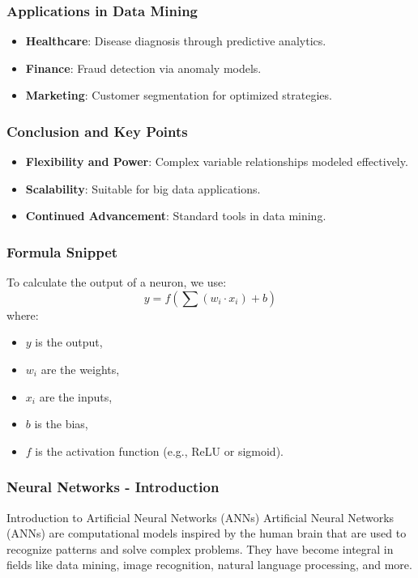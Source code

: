 \documentclass[aspectratio=169]{beamer}
\begin{document}
\begin{frame}[fragile]
    \frametitle{Applications in Data Mining}
    \begin{itemize}
        \item \textbf{Healthcare}: Disease diagnosis through predictive analytics.
        \item \textbf{Finance}: Fraud detection via anomaly models.
        \item \textbf{Marketing}: Customer segmentation for optimized strategies.
    \end{itemize}
\end{frame}

\begin{frame}[fragile]
    \frametitle{Conclusion and Key Points}
    \begin{itemize}
        \item \textbf{Flexibility and Power}: Complex variable relationships modeled effectively.
        \item \textbf{Scalability}: Suitable for big data applications.
        \item \textbf{Continued Advancement}: Standard tools in data mining.
    \end{itemize}
\end{frame}

\begin{frame}[fragile]
    \frametitle{Formula Snippet}
    To calculate the output of a neuron, we use:
    \begin{equation}
        y = f\left(\sum (w_i \cdot x_i) + b\right)
    \end{equation}
    where:
    \begin{itemize}
        \item \(y\) is the output,
        \item \(w_i\) are the weights,
        \item \(x_i\) are the inputs,
        \item \(b\) is the bias,
        \item \(f\) is the activation function (e.g., ReLU or sigmoid).
    \end{itemize}
\end{frame}

\begin{frame}[fragile]
    \frametitle{Neural Networks - Introduction}
    \begin{block}{Introduction to Artificial Neural Networks (ANNs)}
        Artificial Neural Networks (ANNs) are computational models inspired by the human brain that are used to recognize patterns and solve complex problems. They have become integral in fields like data mining, image recognition, natural language processing, and more.
    \end{block}
\end{frame}
\end{document}
